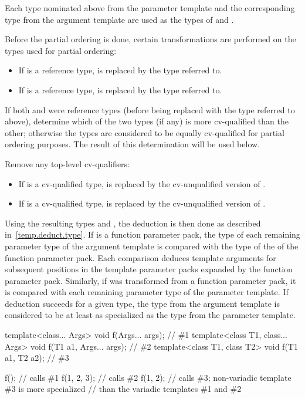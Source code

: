 \pnum
Each type nominated above from the parameter template and the corresponding type from the
argument template are used as the types of
and
.

\pnum
Before the partial ordering is done, certain transformations are performed
on the types used for partial ordering:

\begin{itemize}
\item
If
is a reference type,
is replaced by the type referred to.
\item
If
is a reference type,
is replaced by the type referred to.
\end{itemize}

\pnum
If both
and
were reference types (before being replaced with the type referred to
above), determine which of the two types (if any) is more cv-qualified
than the other; otherwise the types are considered to be equally
cv-qualified for partial ordering purposes. The result of this
determination will be used below.

\pnum
Remove any top-level cv-qualifiers:
\begin{itemize}
\item
If
is a cv-qualified type,
is replaced by the cv-unqualified version of
.
\item
If
is a cv-qualified type,
is replaced by the cv-unqualified version of
.
\end{itemize}

\pnum
Using the resulting types
and
,
the deduction is then done as described in~\ref{temp.deduct.type}.
If  is a function parameter pack, the type  of each remaining
parameter type of the argument template is compared with the type  of
the  of the function parameter pack. Each comparison
deduces template arguments for subsequent positions in the template parameter
packs expanded by the function parameter pack.
Similarly, if  was transformed from a function parameter pack,
it is compared with each remaining parameter type of the parameter template.
If deduction succeeds for a given type,
the type from the argument template is considered to be at least as specialized
as the type from the parameter template.
\begin{example}
\begin{codeblock}
template<class... Args>           void f(Args... args);         // \#1
template<class T1, class... Args> void f(T1 a1, Args... args);  // \#2
template<class T1, class T2>      void f(T1 a1, T2 a2);         // \#3

f();                // calls \#1
f(1, 2, 3);         // calls \#2
f(1, 2);            // calls \#3; non-variadic template \#3 is more specialized
                    // than the variadic templates \#1 and \#2
\end{codeblock}
\end{example}

